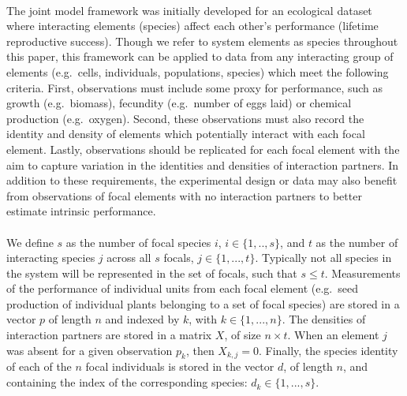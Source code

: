 \documentclass[a4,12pt]{article}
\begin{document}
\begin{refsection}
    \paragraph{}
    The joint model framework was initially developed for an ecological dataset where interacting elements (species) affect each other's performance (lifetime reproductive success). Though we refer to system elements as species throughout this paper, this framework can be applied to data from any interacting group of elements (e.g.\ cells, individuals, populations, species) which meet the following criteria. First, observations must include some proxy for performance, such as growth (e.g.\ biomass), fecundity (e.g.\ number of eggs laid) or chemical production (e.g.\ oxygen). Second, these observations must also record the identity and density of elements which potentially interact with each focal element. Lastly, observations should be replicated for each focal element with the aim to capture variation in the identities and densities of interaction partners. In addition to these requirements, the experimental design or data may also benefit from observations of focal elements with no interaction partners to better estimate intrinsic performance. 

    \paragraph{}
    We define $s$ as the number of focal species $i$, $i \in \{ 1, .., s \}$, and $t$ as the number of interacting species $j$ across all $s$ focals, $j \in \{1, ..., t \}$. Typically not all species in the system will be represented in the set of focals, such that $s \le t$. Measurements of the performance of individual units from each focal element (e.g.\ seed production of individual plants belonging to a set of focal species) are stored in a vector $p$ of length $n$ and indexed by $k$, with $k \in \{1, ..., n \}$. The densities of interaction partners are stored in a matrix $X$, of size $n \times t$. When an element $j$ was absent for a given observation $p_k$, then $X_{k,j} = 0$. Finally, the species identity of each of the $n$ focal individuals is stored in the vector $d$, of length $n$, and containing the index of the corresponding species: $d_k \in \{1, ..., s \}$.


\end{refsection}
\end{document}
